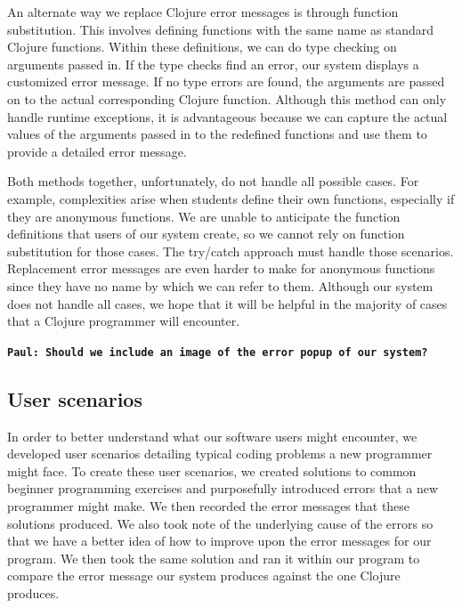 \documentclass[12pt]{article}
\newcommand{\comment}[1]{{\bf \tt  {#1}}}
\newcommand{\emcomment}[1]{\textcolor{ForestGreen}{\comment{Elena: {#1}}}}
\newcommand{\pscomment}[1]{\textcolor{Coquelicot}{\comment{Paul: {#1}}}}
\newcommand{\alcomment}[1]{\textcolor{red}{\comment{Lemmon: {#1}}}}
\begin{document}

An alternate way we replace Clojure error messages is through function substitution.
This involves defining functions with the same name as standard Clojure functions.
Within these definitions, we can do type checking on arguments passed in.
If the type checks find an error, our system displays a customized error message.
If no type errors are found, the arguments are passed on to the actual corresponding 
Clojure function.
Although this method can only handle runtime exceptions, it is advantageous because we 
can capture the actual values of the arguments passed in to the redefined functions and 
use them to provide a detailed error message.

Both methods together, unfortunately, do not handle all possible cases.
For example, complexities arise when students define their own functions, especially if 
they are anonymous functions.
We are unable to anticipate the function definitions that users of our system create, so 
we cannot rely on function substitution for those cases.
The try/catch approach must handle those scenarios.
Replacement error messages are even harder to make for anonymous functions since they 
have no name by which we can refer to them.
Although our system does not handle all cases, we hope that it will be helpful in the 
majority of cases that a Clojure programmer will encounter.


\pscomment{Should we include an image of the error popup of our system?}

\subsection{User scenarios}\label{sec:scenarios}

In order to better understand what our software users might encounter, we developed user 
scenarios detailing typical coding problems a new programmer might face.
To create these user scenarios, we created solutions to common beginner programming 
exercises and purposefully introduced errors that a new programmer might make.
We then recorded the error messages that these solutions produced.
We also took note of the underlying cause of the errors so that we have a better idea of 
how to improve upon the error messages for our program.
We then took the same solution and ran it within our program to compare the error 
message our system produces against the one Clojure produces.
\end{document}
